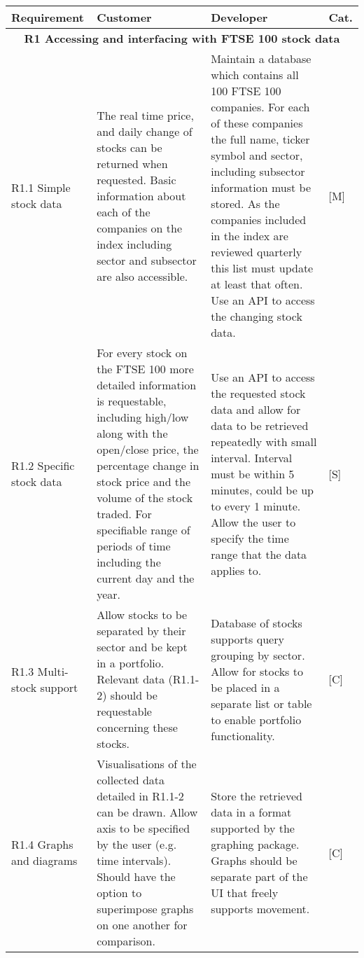 \documentclass{IEEEtran}
\begin{document}
	\begin{center}
	\begin{longtable}{ | m{3cm} | m{7cm} | m{7cm} | m{0.5cm} | } 
		\hline
		Requirement & Customer & Developer & Cat. \\
		\hline
		\multicolumn{4}{|c|}{\textbf{R1 Accessing and interfacing with FTSE 100 stock data}} \\
		\hline
		
		R1.1 Simple stock data & 
		The real time price, and daily change of stocks can be returned when requested. Basic information about each of the companies on the index including sector and subsector are also accessible. & 
		Maintain a database which contains all 100 FTSE 100 companies. For each of these companies the full name, ticker symbol and sector, including subsector information must be stored. As the companies included in the index are reviewed quarterly this list must update at least that often. Use an API to access the changing stock data. & 
		[M] \\ 

		\hline
		
		R1.2 Specific stock data & 
		For every stock on the FTSE 100 more detailed information is requestable, including high/low along with the open/close price, the percentage change in stock price and the volume of the stock traded. For specifiable range of periods of time including the current day and the year. & 
		Use an API to access the requested stock data and allow for data to be retrieved repeatedly with small interval. Interval must be within 5 minutes, could be up to every 1 minute. Allow the user to specify the time range that the data applies to. & 
		[S] \\
		
		\hline
		
		R1.3 Multi-stock support & 
		Allow stocks to be separated by their sector and be kept in a portfolio. Relevant data (R1.1-2) should be requestable concerning these stocks. & 
		Database of stocks supports query grouping by sector. Allow for stocks to be placed in a separate list or table to enable portfolio functionality. & 
		[C]\\
		
		\hline
		
		R1.4 Graphs and diagrams  & 
		Visualisations of the collected data detailed in R1.1-2 can be drawn. Allow axis to be specified by the user (e.g. time intervals). Should have the option to superimpose graphs on one another for comparison. &
 		Store the retrieved data in a format supported by the graphing package. Graphs should be separate part of the UI that freely supports movement. & 
 		[C] \\
 

\end{longtable}
\end{center}
\end{document}
